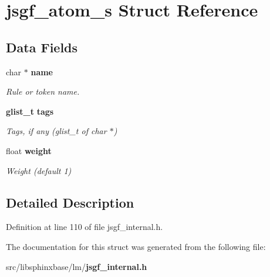 \section{jsgf\+\_\+atom\+\_\+s Struct Reference}
\label{structjsgf__atom__s}
\subsection*{Data Fields}
\begin{DoxyCompactItemize}
\item 
char $\ast$ {\bf name}\label{structjsgf__atom__s_ac7473e48f49258c5e5ef65bbb669b19e}

\begin{DoxyCompactList}\small\item\em Rule or token name. \end{DoxyCompactList}\item 
{\bf glist\+\_\+t} {\bf tags}\label{structjsgf__atom__s_a4ecab128d84fd748efe52e338e7e2ecb}

\begin{DoxyCompactList}\small\item\em Tags, if any (glist\+\_\+t of char $\ast$) \end{DoxyCompactList}\item 
float {\bf weight}\label{structjsgf__atom__s_a50672ba6d1e24c55bf8b58b97114effa}

\begin{DoxyCompactList}\small\item\em Weight (default 1) \end{DoxyCompactList}\end{DoxyCompactItemize}


\subsection{Detailed Description}


Definition at line 110 of file jsgf\+\_\+internal.\+h.



The documentation for this struct was generated from the following file\+:\begin{DoxyCompactItemize}
\item 
src/libsphinxbase/lm/{\bf jsgf\+\_\+internal.\+h}\end{DoxyCompactItemize}
